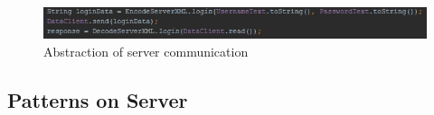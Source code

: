 \begin{figure}[H]
\centering
\includegraphics[width=\textwidth]{billeder/facadepattern.png}
\caption{Abstraction of server communication}
\label{fig:facadepattern}
\end{figure} 

\subsection{Patterns on Server}

